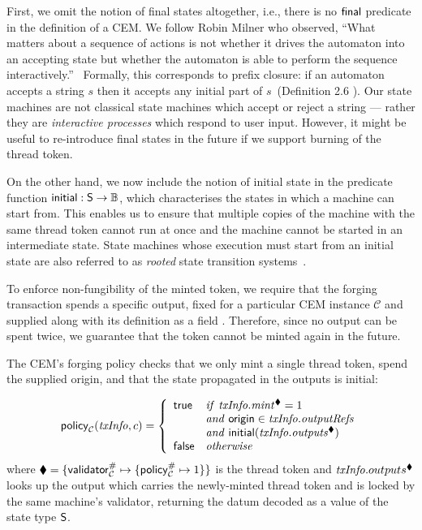 First, we omit the notion of final states altogether, i.e., there is
no $\textsf{final}$ predicate in the definition of a CEM.
We follow Robin Milner who observed, ``What matters about a sequence of
actions is not whether it drives the automaton into an accepting state
but whether the automaton is able to perform the sequence
interactively.''~\cite{milner-pibook} Formally, this corresponds to
prefix closure: if an automaton accepts a string $s$ then it accepts
any initial part of $s$~(Definition 2.6 \cite{milner-pibook}). Our
state machines are not classical state machines which accept or
reject a string --- rather they are \emph{interactive processes} which
respond to user input.
However, it might be useful to re-introduce final states in the future if we support burning of the thread token.

On the other hand, we now include the notion of initial state in the
predicate function $\mathsf{initial} : \textsf{S} \rightarrow \mathbb{B}$, which characterises
the states in which a machine can start from. This enables us to ensure
that multiple copies of the machine with the same thread token cannot
run at once and the machine cannot be started in an intermediate state.
State machines whose execution must start from an initial state are also
referred to as \emph{rooted} state transition systems~\cite{TLSS}.

To enforce non-fungibility of the minted token, we require
that the forging transaction spends a specific output, fixed for a
particular CEM instance $\mathcal{C}$ and supplied along with its definition as a
field .  Therefore, since no output can be spent twice, we
guarantee that the token cannot be minted again in the future.

The CEM's forging policy checks that we only mint a single thread
token, spend the supplied origin, and that the state propagated in the
outputs is initial:

\begin{displaymath}
\mathsf{policy}_\mathcal{C}(\mathit{txInfo}, c) = \left\{
  \begin{array}{lll}
  \mathsf{true}  & \mathit{if} \ \mathit{txInfo}.\mathit{mint}^\blacklozenge = 1 \\
         & \mathit{and} \ \textsf{origin} \in \mathit{txInfo}.\mathit{outputRefs} \\
         & \mathit{and} \ \mathsf{initial}(\mathit{txInfo}.\mathit{outputs}^\blacklozenge) \\
  \textsf{false} & \mathit{otherwise}
  \end{array}
\right.
\end{displaymath}
%
where $\blacklozenge = \{\mathsf{validator}_\mathcal{C}^{\#} \mapsto \{ \mathsf{policy}_\mathcal{C}^{\#} \mapsto 1 \}\}$
is the thread token and $\mathit{txInfo}.outputs^\blacklozenge$ looks up the output
which carries the newly-minted thread token and is locked by the same
machine's validator, returning the datum decoded as a value of the
state type $\textsf{S}$.

